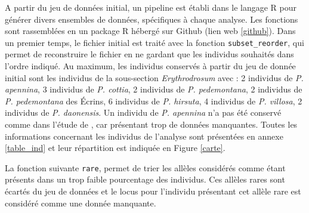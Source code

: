 A partir du jeu de données initial, un pipeline est établi dans le langage R \citep{RTeam2017} pour générer divers ensembles de données, spécifiques à chaque analyse. Les fonctions sont rassemblées en un package R hébergé sur Github (lien web \ref{github}). Dans un premier temps, le fichier initial est traité avec la fonction \verb|subset_reorder|, qui permet de reconstruire le fichier en ne gardant que les individus souhaités dans l'ordre indiqué. Au maximum, les individus conservés à partir du jeu de donnée initial sont les individus de la sous-section \textit{Erythrodrosum} avec :
2 individus de \textit{P. apennina}, 
3 individus de \textit{P. cottia}, 
2 individus de \textit{P. pedemontana}, 
2 individus de \textit{P. pedemontana} des Écrins, 
6 individus de \textit{P. hirsuta}, 
4 individus de \textit{P. villosa}, 
2 individus de \textit{P. daonensis}.
Un individu de \textit{P. apennina} n'a pas été conservé comme dans l'étude de \citet{Boucher2016a}, car présentant trop de données manquantes. Toutes les informations concernant les individus de l'analyse sont présentées en annexe \ref{table_ind} et leur répartition est indiquée en Figure \ref{carte}.

La fonction suivante \verb|rare|, permet de trier les allèles considérés comme étant présents dans un trop faible pourcentage des individus. Ces allèles rares sont écartés du jeu de données et le locus pour l'individu présentant cet allèle rare est considéré comme une donnée manquante.


